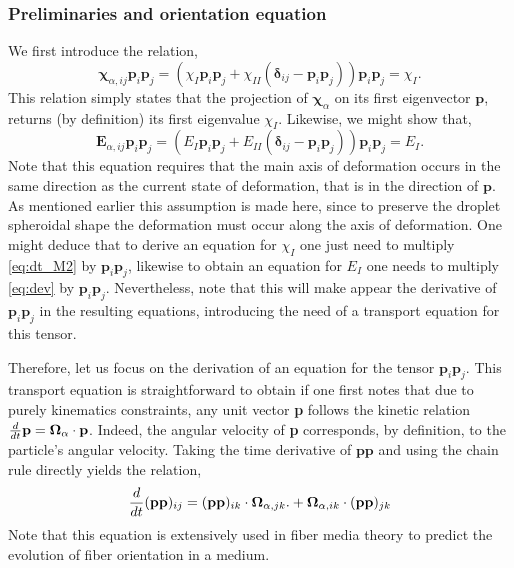 \subsubsection{Preliminaries and orientation equation}
We first introduce the relation,
\begin{equation}
    \bm\chi_{\alpha,ij} \textbf{p}_i\textbf{p}_j
    = 
    (
        \chi_I \textbf{p}_i\textbf{p}_j
        + \chi_{II} (\bm\delta_{ij} - \textbf{p}_i\textbf{p}_j)
    ) \textbf{p}_i\textbf{p}_j
    = \chi_I.
    \label{eq:chi_I_def}
\end{equation} 
This relation simply states that the projection of $\bm\chi_\alpha$ on its first eigenvector $\textbf{p}$, returns (by definition) its first eigenvalue $\chi_I$. 
Likewise, we might show that, 
\begin{equation}
    \textbf{E}_{\alpha,ij} \textbf{p}_i\textbf{p}_j
    = 
    (
        E_I \textbf{p}_i\textbf{p}_j
        + E_{II} (\bm\delta_{ij} - \textbf{p}_i\textbf{p}_j)
    ) \textbf{p}_i\textbf{p}_j
    = E_I.
    \label{eq:E_I_def}
\end{equation} 
Note that this equation requires that the main axis of deformation occurs in the same direction as the current state of deformation, that is in the direction of $\textbf{p}$. 
As mentioned earlier this assumption is made here, since to preserve the droplet spheroidal shape the deformation must occur along the axis of deformation. 
One might deduce that to derive an equation for $\chi_I$ one just need to multiply \ref{eq:dt_M2} by $\textbf{p}_i \textbf{p}_j$, likewise to obtain an equation for $E_I$ one needs to multiply \ref{eq:dev} by $\textbf{p}_i \textbf{p}_j$. 
Nevertheless, note that this will make appear the derivative of $\textbf{p}_i \textbf{p}_j$ in the resulting equations, introducing the need of a transport equation for this tensor. 

Therefore, let us focus on the derivation of an equation for the tensor  $\textbf{p}_i \textbf{p}_j$. 
This transport equation is straightforward to obtain if one first notes that due to purely kinematics constraints, any unit vector \textbf{p} follows the kinetic relation $\frac{d}{dt} \textbf{p} = \bm\Omega_\alpha \cdot \textbf{p}$.
Indeed, the angular velocity of \textbf{p} corresponds, by definition, to the particle's angular velocity. 
Taking the time derivative of $\textbf{pp}$ and using the chain rule directly yields the relation, 
\begin{equation}
    \ddt (\textbf{pp})_{ij}
    = 
    (\textbf{pp})_{ik}\cdot\bm\Omega_{\alpha,jk}. 
    +\bm\Omega_{\alpha,ik}\cdot (\textbf{pp})_{jk}
    \label{eq:dt_pp}
\end{equation}
Note that this equation is extensively used in fiber media theory to predict the evolution of fiber orientation in a medium. 

